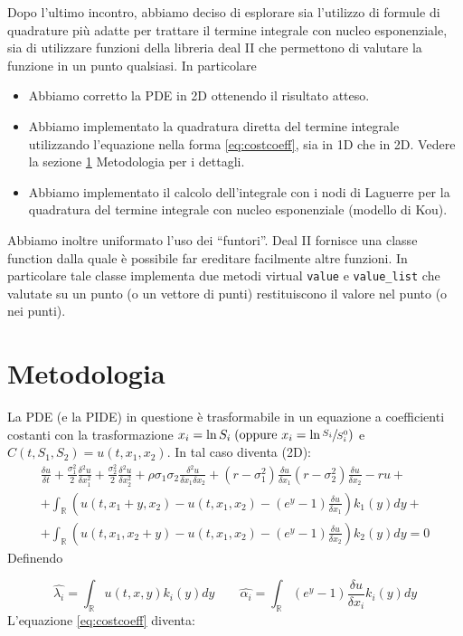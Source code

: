 \documentclass[a4paper,10pt]{article}
\newcommand{\der}[2]{\frac{\delta #1}{\delta #2}}
\newcommand{\dder}[2]{\frac{\delta^2 #1}{\delta #2^2}}
\newcommand{\dmix}[3]{\frac{\delta^2 #1}{\delta #2 \delta #3}}
\begin{document}
Dopo l'ultimo incontro, abbiamo deciso di esplorare sia l'utilizzo di formule di quadrature più adatte per trattare il termine integrale con nucleo esponenziale, sia di utilizzare funzioni della libreria deal II che permettono di valutare la funzione in un punto qualsiasi. In particolare

\begin{itemize}
 \item Abbiamo corretto la PDE in 2D ottenendo il risultato atteso.
 \item Abbiamo implementato la quadratura diretta del termine integrale utilizzando l'equazione nella forma \eqref{eq:costcoeff}, sia in 1D che in 2D. Vedere la sezione \ref{sec:metod} Metodologia per i dettagli.
 \item Abbiamo implementato il calcolo dell'integrale con i nodi di Laguerre per la quadratura del termine integrale con nucleo esponenziale (modello di Kou).
\end{itemize}

Abbiamo inoltre uniformato l'uso dei ``funtori''. Deal II fornisce una classe function dalla quale è possibile far ereditare facilmente altre funzioni. In particolare tale classe implementa due metodi virtual \verb!value! e \verb!value_list! che valutate su un punto (o un vettore di punti) restituiscono il valore nel punto (o nei punti). 

\section{Metodologia}
\label{sec:metod}
La PDE (e la PIDE) in questione è trasformabile in un equazione a coefficienti costanti con la trasformazione $x_i=\ln{S_i} \; (\text{oppure } x_i=\ln{\sfrac{S_i}{S_i^0}})$ e $C(t,S_1,S_2)=u(t,x_1,x_2)$. In tal caso diventa (2D):
{
\begin{multline}
 \der{u}{t}+\frac{\sigma_1^2}{2}\dder{u}{x_1}+\frac{\sigma_2^2}{2}\dder{u}{x_2}+\rho\sigma_1\sigma_2\dmix{u}{x_1}{x_2}+
 \left(r-\sigma_1^2\right)\der{u}{x_1}
 \left(r-\sigma_2^2\right)\der{u}{x_2}-ru+\\
 +\int_\mathbb{R}\left( u(t,x_1+y,x_2)-u(t,x_1,x_2)-(e^y-1)\der{u}{x_1}\right)k_1(y)dy+\\
 +\int_\mathbb{R}\left( u(t,x_1,x_2+y)-u(t,x_1,x_2)-(e^y-1)\der{u}{x_2}\right)k_2(y)dy=0
 \label{eq:costcoeff}
 \end{multline}
}
Definendo 

\begin{equation*}
 \hat{\lambda_i}=\int_\mathbb{R}u(t,x,y)k_i(y)dy \qquad \hat{\alpha_i}=\int_\mathbb{R}(e^y-1)\der{u}{x_i}k_i(y)dy
\end{equation*}
L'equazione \eqref{eq:costcoeff} diventa: 
\end{document}
